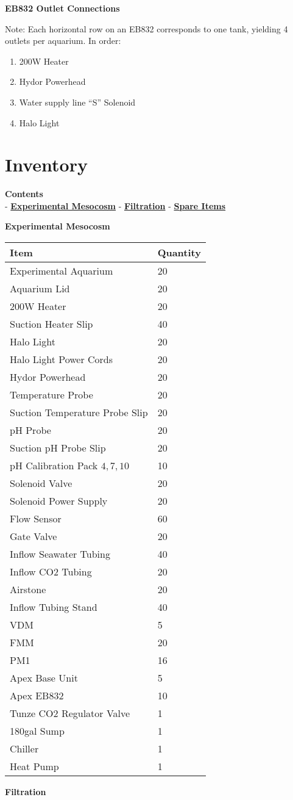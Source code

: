 \documentclass[]{book}
\providecommand{\tightlist}{%
  \setlength{\itemsep}{0pt}\setlength{\parskip}{0pt}}
\begin{document}
 \textbf{EB832 Outlet Connections}

Note: Each horizontal row on an EB832 corresponds to one tank, yielding
4 outlets per aquarium. In order:

\begin{enumerate}
\def\labelenumi{\arabic{enumi}.}
\tightlist
\item
  200W Heater
\item
  Hydor Powerhead
\item
  Water supply line ``S'' Solenoid
\item
  Halo Light
\end{enumerate}

\chapter{Inventory}\label{inventory}

\textbf{Contents}\\
- \protect\hyperlink{Experimental_Mesocosm}{\textbf{Experimental
Mesocosm}} - \protect\hyperlink{Filtration}{\textbf{Filtration}} -
\protect\hyperlink{Spare_Items}{\textbf{Spare Items}}

 \textbf{Experimental Mesocosm}

\begin{longtable}[]{@{}ll@{}}
\toprule
Item & Quantity\tabularnewline
\midrule
\endhead
Experimental Aquarium & 20\tabularnewline
Aquarium Lid & 20\tabularnewline
200W Heater & 20\tabularnewline
Suction Heater Slip & 40\tabularnewline
Halo Light & 20\tabularnewline
Halo Light Power Cords & 20\tabularnewline
Hydor Powerhead & 20\tabularnewline
Temperature Probe & 20\tabularnewline
Suction Temperature Probe Slip & 20\tabularnewline
pH Probe & 20\tabularnewline
Suction pH Probe Slip & 20\tabularnewline
pH Calibration Pack \(4,7,10\) & 10\tabularnewline
Solenoid Valve & 20\tabularnewline
Solenoid Power Supply & 20\tabularnewline
Flow Sensor & 60\tabularnewline
Gate Valve & 20\tabularnewline
Inflow Seawater Tubing & 40\tabularnewline
Inflow CO2 Tubing & 20\tabularnewline
Airstone & 20\tabularnewline
Inflow Tubing Stand & 40\tabularnewline
VDM & 5\tabularnewline
FMM & 20\tabularnewline
PM1 & 16\tabularnewline
Apex Base Unit & 5\tabularnewline
Apex EB832 & 10\tabularnewline
Tunze CO2 Regulator Valve & 1\tabularnewline
180gal Sump & 1\tabularnewline
Chiller & 1\tabularnewline
Heat Pump & 1\tabularnewline
\bottomrule
\end{longtable}

 \textbf{Filtration}
\end{document}
